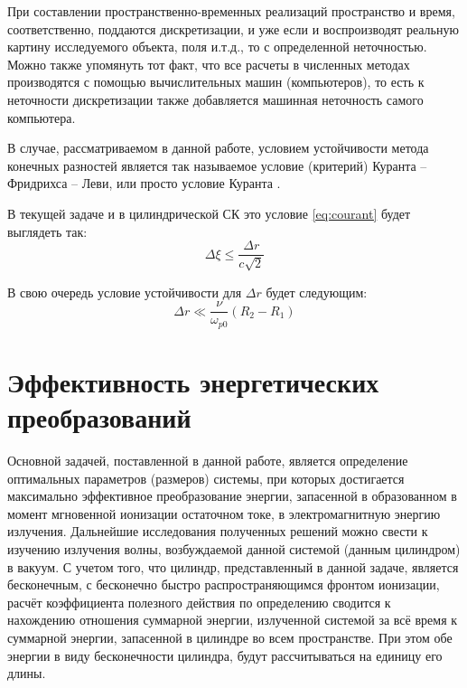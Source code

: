 \documentclass[a4paper]{article}
\begin{document}
При составлении пространственно-временных реализаций пространство и время, соответственно, поддаются дискретизации, и уже если и воспроизводят реальную картину исследуемого объекта, поля и.т.д., то с определенной неточностью. Можно также упомянуть тот факт, что все расчеты в численных методах производятся с помощью вычислительных машин (компьютеров), то есть к неточности дискретизации также добавляется машинная неточность самого компьютера.

В случае, рассматриваемом в данной работе, условием устойчивости метода конечных разностей является так называемое условие (критерий) Куранта -- Фридрихса -- Леви, или просто условие Куранта \cite{courant1945}.

В текущей задаче и в цилиндрической СК это условие \eqref{eq:courant} будет выглядеть так:
\begin{equation}
	\Delta\xi\leq\frac{\Delta r}{c\sqrt{2}}
	\label{eq:courant}
\end{equation}

В свою очередь условие устойчивости для $\Delta r$ будет следующим:
\begin{equation}
	\Delta r\ll\dfrac{\nu}{\omega_{p 0}}\left(R_{2}-R_{1}\right)
	\label{eq:courant_1}
\end{equation}








\newpage
\section{Эффективность энергетических преобразований}

Основной задачей, поставленной в данной работе, является определение оптимальных параметров (размеров) системы, при которых достигается максимально эффективное преобразование энергии, запасенной в образованном в момент мгновенной ионизации остаточном токе, в электромагнитную энергию излучения. Дальнейшие исследования полученных решений можно свести к изучению излучения волны, возбуждаемой данной системой (данным цилиндром) в вакуум. С учетом того, что цилиндр, представленный в данной задаче, является бесконечным, с бесконечно быстро распространяющимся фронтом ионизации, расчёт коэффициента полезного действия по определению сводится к нахождению отношения суммарной энергии, излученной системой за всё время к суммарной энергии, запасенной в цилиндре во всем пространстве. При этом обе энергии в виду бесконечности цилиндра, будут рассчитываться на единицу его длины. 
\end{document}
